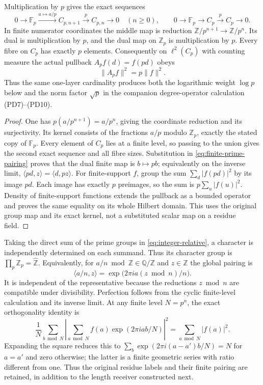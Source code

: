 \begin{corollary}
\label{cor:prime-degree}
Multiplication by $p$ gives the exact sequences
\[
 0\longrightarrow\mathbb F_p\xrightarrow{a\mapsto a/p}C_{p,n+1}
 \xrightarrow{\ p\ }C_{p,n}\longrightarrow0\quad(n\ge0),
 \qquad
 0\longrightarrow\mathbb F_p\longrightarrow C_p
 \xrightarrow{\ p\ }C_p\longrightarrow0.
 \tag{RP30a}\label{eq:prime-degree}
\]
In finite numerator coordinates the middle map is reduction
$\mathbb Z/p^{n+1}\to\mathbb Z/p^n$. Its dual is multiplication by
$p$, and the dual map on $\mathbb Z_p$ is multiplication by $p$.
Every fibre on $C_p$ has exactly $p$ elements. Consequently on
$\ell^2(C_p)$ with counting measure the actual pullback
$A_pf(d)=f(pd)$ obeys
\[
 \|A_pf\|^2=p\|f\|^2.
 \tag{RP30b}\label{eq:prime-degree-norm}
\]
Thus the same one-layer cardinality produces both the logarithmic
weight $\log p$ below and the norm factor $\sqrt p$ in the companion
degree-operator calculation (PD7)--(PD10).
\end{corollary}
\begin{proof}
One has $p(a/p^{n+1})=a/p^n$, giving the coordinate reduction and its
surjectivity. Its kernel consists of the fractions $a/p$ modulo
$\mathbb Z_p$, exactly the stated copy of $\mathbb F_p$. Every element
of $C_p$ lies at a finite level, so passing to the union gives the
second exact sequence and all fibre sizes. Substitution in
\eqref{eq:finite-prime-pairing} proves that the dual finite map is
$b\mapsto pb$; equivalently on the inverse limit,
$\langle pd,z\rangle=\langle d,pz\rangle$.
For finite-support $f$, group the sum $\sum_d|f(pd)|^2$ by its image
$pd$. Each image has exactly $p$ preimages, so the sum is
$p\sum_u|f(u)|^2$. Density of finite-support functions extends the
pullback as a bounded operator and proves the same equality on its
whole Hilbert domain. This uses the original group map and its exact
kernel, not a substituted scalar map on a residue field.
\end{proof}

Taking the direct sum of the prime groups in
\eqref{eq:integer-relative}, a character is independently determined
on each summand. Thus its character group is
$\prod_p\mathbb Z_p=\widehat{\mathbb Z}$. Equivalently, for
$a/n\bmod\mathbb Z\in\mathbb Q/\mathbb Z$ and
$z\in\widehat{\mathbb Z}$ the global pairing is
\[
 \langle a/n,z\rangle=\exp\bigl(2\pi i a(z\bmod n)/n\bigr).
 \tag{RP31}\label{eq:global-character-pairing}
\]
It is independent of the representative because the reductions
$z\bmod n$ are compatible under divisibility. Perfection follows from
the cyclic finite-level calculation and its inverse limit. At any
finite level $N=p^n$, the exact orthogonality identity is
\[
 \frac1N\sum_{b\bmod N}
 \left|\sum_{a\bmod N}f(a)\exp(2\pi i ab/N)\right|^2
 =\sum_{a\bmod N}|f(a)|^2.
 \tag{RP32}\label{eq:finite-parseval}
\]
Expanding the square reduces this to
$\sum_b\exp(2\pi i(a-a')b/N)=N$ for $a=a'$ and zero otherwise;
the latter is a finite geometric series with ratio different from one.
Thus the original residue labels and their finite pairing are retained,
in addition to the length receiver constructed next.

